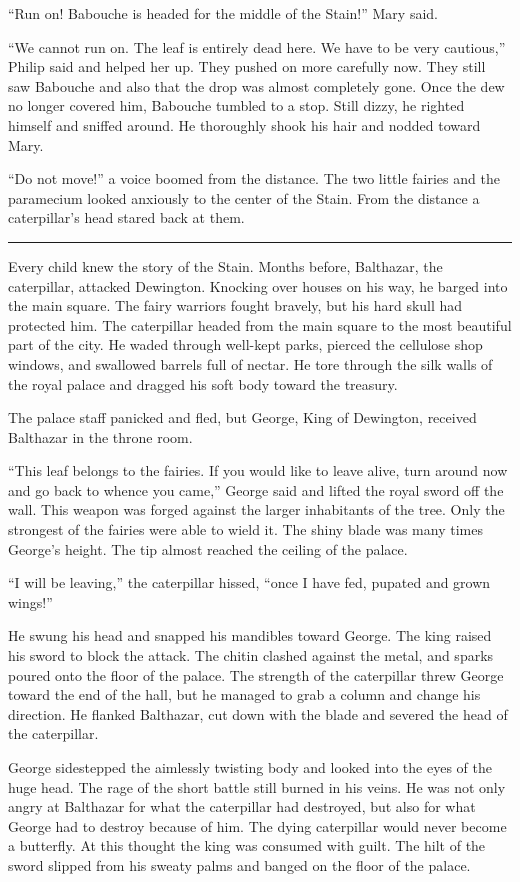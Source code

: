 \documentclass[10pt]{memoir}
\renewcommand{\pfbreakdisplay}{\bigskip \ding{166} \bigskip}
\newcommand{\secbreak}{\fancybreak{\pfbreakdisplay}}
\begin{document}
``Run on! Babouche is headed for the middle of the Stain!'' Mary said.

``We cannot run on. The leaf is entirely dead here. We have to be very
cautious,'' Philip said and helped her up. They pushed on more carefully now.
They still saw Babouche and also that the drop was almost completely gone. Once
the dew no longer covered him, Babouche tumbled to a stop. Still dizzy, he
righted himself and sniffed around. He thoroughly shook his hair and nodded
toward Mary.

``Do not move!'' a voice boomed from the distance. The two little fairies and
the paramecium looked anxiously to the center of the Stain. From the distance a
caterpillar's head stared back at them.

\secbreak

Every child knew the story of the Stain. Months before, Balthazar, the
caterpillar, attacked Dewington. Knocking over houses on his way, he barged
into the main square. The fairy warriors fought bravely, but his hard skull
had protected him. The caterpillar headed from the main square to the most
beautiful part of the city. He waded through well-kept parks, pierced the
cellulose shop windows, and swallowed barrels full of nectar. He tore through
the silk walls of the royal palace and dragged his soft body toward the
treasury.

The palace staff panicked and fled, but George, King of Dewington, received
Balthazar in the throne room.

``This leaf belongs to the fairies. If you would like to leave alive, turn
around now and go back to whence you came,'' George said and lifted the royal
sword off the wall. This weapon was forged against the larger inhabitants of
the tree. Only the strongest of the fairies were able to wield it. The shiny
blade was many times George's height. The tip almost reached the ceiling of the
palace.

``I will be leaving,'' the caterpillar hissed, ``once I have fed, pupated and
grown wings!''

He swung his head and snapped his mandibles toward George. The king raised his
sword to block the attack. The chitin clashed against the metal, and sparks
poured onto the floor of the palace. The strength of the caterpillar threw
George toward the end of the hall, but he managed to grab a column and change
his direction. He flanked Balthazar, cut down with the blade and severed the
head of the caterpillar.

George sidestepped the aimlessly twisting body and looked into the eyes of the
huge head. The rage of the short battle still burned in his veins. He was not
only angry at Balthazar for what the caterpillar had destroyed, but also for
what George had to destroy because of him. The dying caterpillar would never
become a butterfly. At this thought the king was consumed with guilt. The hilt
of the sword slipped from his sweaty palms and banged on the floor of the
palace.
\end{document}
